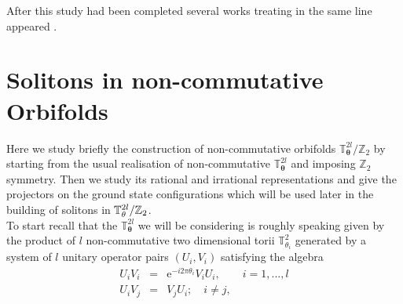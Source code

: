 \documentclass[a4paper,12pt]{article}
\begin{document}
After this study had been completed several works treating in the
same line appeared \cite{l,m,n,o}.
\section{Solitons in non-commutative Orbifolds}

Here we study briefly the construction of non-commutative orbifolds
$\mathbb{T%
}_{\mathbf{\theta }}^{2l}/\mathbb{Z}_{2}$ by starting from the usual
realisation of non-commutative $\mathbb{T}_{\mathbf{\theta }}^{2l}$ and
imposing $\mathbb{Z}_{2}$ symmetry. Then we study its rational and
irrational representations and give the projectors on the ground state configurations
which will be used later in the building of solitons in $\mathbb{T}_{%
\mathbf{\theta }}^{2l}/\mathbb{Z}_{2}$.\\
 To start recall that the $\mathbb{T}%
_{\mathbf{\theta }}^{2l}$ we will be considering is roughly speaking given
by the product of $l$ non-commutative two dimensional torii $\mathbb{T}%
_{\theta _{i}}^{2}$ generated by a system of $l$ unitary operator pairs $%
\left( U_{i},V_{i}\right) $ satisfying the algebra \cite{j}
\begin{eqnarray}
U_{i}V_{i} &=&\text{e}^{-i2\pi \theta _{i}}V_{i}U_{i},\qquad i=1,...,l  \label{nctorus} \\
U_{i}V_{j} &=&V_{j}U_{i};\quad i\neq j,  \label{nctorus2}
\end{eqnarray}
\end{document}
